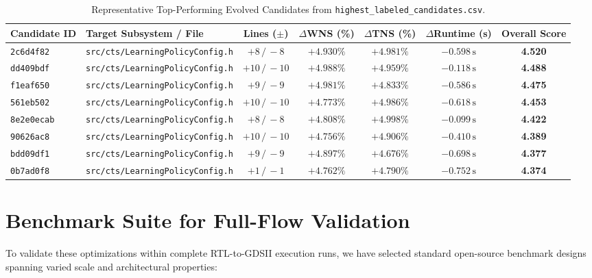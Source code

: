 \documentclass[10pt,twocolumn]{article}
\begin{document}
\begin{table}[t]
\centering
\caption{Representative Top-Performing Evolved Candidates from \texttt{highest\_labeled\_candidates.csv}.}
\label{tab:top_candidates}
\vspace{0.4em}
\footnotesize
\setlength{\tabcolsep}{5pt}
\begin{tabular}{|l|l|c|c|c|c|c|}
\hline
\textbf{Candidate ID} & \textbf{Target Subsystem / File} & \textbf{Lines ($\pm$)} & \textbf{$\Delta$WNS (\%)} & \textbf{$\Delta$TNS (\%)} & \textbf{$\Delta$Runtime (s)} & \textbf{Overall Score} \\
\hline
\texttt{2c6d4f82} & \texttt{src/cts/LearningPolicyConfig.h} & $+8\,/\,-8$   & $+4.930\%$ & $+4.981\%$ & $-0.598\,\text{s}$ & \textbf{4.520} \\
\texttt{dd409bdf} & \texttt{src/cts/LearningPolicyConfig.h} & $+10\,/\,-10$ & $+4.988\%$ & $+4.959\%$ & $-0.118\,\text{s}$ & \textbf{4.488} \\
\texttt{f1eaf650} & \texttt{src/cts/LearningPolicyConfig.h} & $+9\,/\,-9$   & $+4.981\%$ & $+4.833\%$ & $-0.586\,\text{s}$ & \textbf{4.475} \\
\texttt{561eb502} & \texttt{src/cts/LearningPolicyConfig.h} & $+10\,/\,-10$ & $+4.773\%$ & $+4.986\%$ & $-0.618\,\text{s}$ & \textbf{4.453} \\
\texttt{8e2e0ecab} & \texttt{src/cts/LearningPolicyConfig.h} & $+8\,/\,-8$   & $+4.808\%$ & $+4.998\%$ & $-0.099\,\text{s}$ & \textbf{4.422} \\
\texttt{90626ac8} & \texttt{src/cts/LearningPolicyConfig.h} & $+10\,/\,-10$ & $+4.756\%$ & $+4.906\%$ & $-0.410\,\text{s}$ & \textbf{4.389} \\
\texttt{bdd09df1} & \texttt{src/cts/LearningPolicyConfig.h} & $+9\,/\,-9$   & $+4.897\%$ & $+4.676\%$ & $-0.698\,\text{s}$ & \textbf{4.377} \\
\texttt{0b7ad0f8} & \texttt{src/cts/LearningPolicyConfig.h} & $+1\,/\,-1$   & $+4.762\%$ & $+4.790\%$ & $-0.752\,\text{s}$ & \textbf{4.374} \\
\hline
\end{tabular}
\end{table}

\section{Benchmark Suite for Full-Flow Validation}
To validate these optimizations within complete RTL-to-GDSII execution runs, we have selected standard open-source benchmark designs spanning varied scale and architectural properties:
\end{document}
